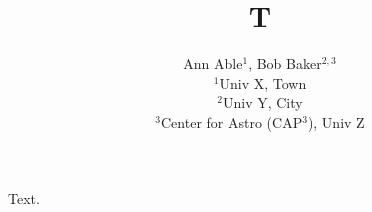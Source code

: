 \documentclass{article}
\begin{document}
\title{T}
\author{Ann Able$^{1}$, Bob Baker$^{2,3}$ \\ $^1$Univ X, Town \\ $^2$Univ Y, City \\ $^3$Center for Astro (CAP$^3$), Univ Z}
\maketitle
Text.
\end{document}
